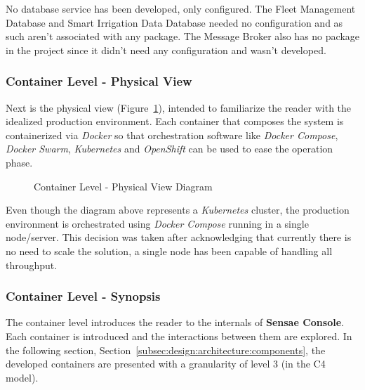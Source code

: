 No database service has been developed, only configured. The Fleet Management Database and Smart Irrigation Data Database needed no configuration and as such aren't associated with any package. The Message Broker also has no package in the project since it didn't need any configuration and wasn't developed.

\subsubsection*{Container Level - Physical View}
\label{subsubsec:design:architecture:container:physical}

Next is the physical view (Figure~\ref{fig:design:architecture:container:physical:diagram}), intended to familiarize the reader with the idealized production environment. Each container that composes the system is containerized via \textit{Docker} so that orchestration software like \textit{Docker Compose}, \textit{Docker Swarm}, \textit{Kubernetes} and \textit{OpenShift} can be used to ease the operation phase.

\begin{figure}[H]
   \centering
   \resizebox{\columnwidth}{!}
   {
      
   }
   \caption[Container Level - Physical View Diagram]{Container Level - Physical View Diagram}
   \label{fig:design:architecture:container:physical:diagram}
\end{figure}

Even though the diagram above represents a \textit{Kubernetes} cluster, the production environment is orchestrated using \textit{Docker Compose} running in a single node/server. This decision was taken after acknowledging that currently there is no need to scale the solution, a single node has been capable of handling all throughput.

\subsubsection*{Container Level - Synopsis}
\label{subsubsec:design:architecture:container:synopsis}

The container level introduces the reader to the internals of \textbf{Sensae Console}. Each container is introduced and the interactions between them are explored.
In the following section, Section~\ref{subsec:design:architecture:components}, the developed containers are presented with a granularity of level 3 (in the C4 model).

